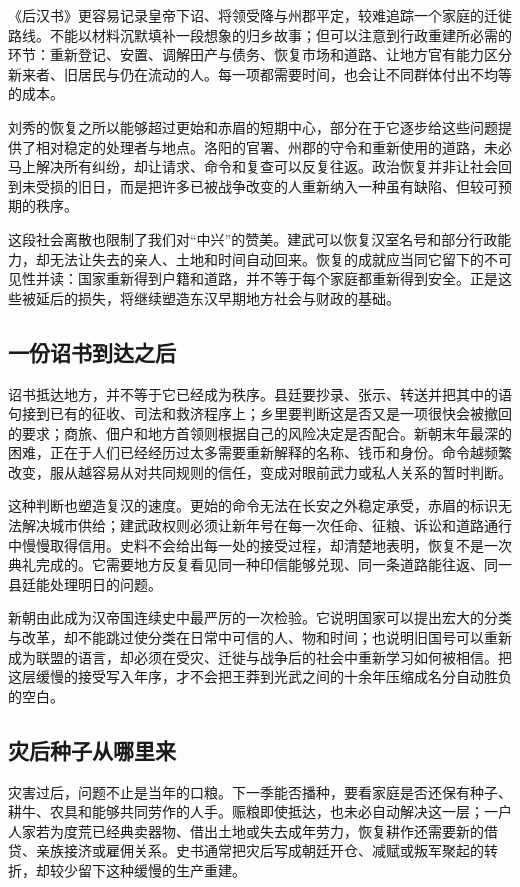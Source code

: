 《后汉书》更容易记录皇帝下诏、将领受降与州郡平定，较难追踪一个家庭的迁徙路线。不能以材料沉默填补一段想象的归乡故事；但可以注意到行政重建所必需的环节：重新登记、安置、调解田产与债务、恢复市场和道路、让地方官有能力区分新来者、旧居民与仍在流动的人。每一项都需要时间，也会让不同群体付出不均等的成本。

刘秀的恢复之所以能够超过更始和赤眉的短期中心，部分在于它逐步给这些问题提供了相对稳定的处理者与地点。洛阳的官署、州郡的守令和重新使用的道路，未必马上解决所有纠纷，却让请求、命令和复查可以反复往返。政治恢复并非让社会回到未受损的旧日，而是把许多已被战争改变的人重新纳入一种虽有缺陷、但较可预期的秩序。

这段社会离散也限制了我们对“中兴”的赞美。建武可以恢复汉室名号和部分行政能力，却无法让失去的亲人、土地和时间自动回来。恢复的成就应当同它留下的不可见性并读：国家重新得到户籍和道路，并不等于每个家庭都重新得到安全。正是这些被延后的损失，将继续塑造东汉早期地方社会与财政的基础。

\subsection{一份诏书到达之后}

诏书抵达地方，并不等于它已经成为秩序。县廷要抄录、张示、转送并把其中的语句接到已有的征收、司法和救济程序上；乡里要判断这是否又是一项很快会被撤回的要求；商旅、佃户和地方首领则根据自己的风险决定是否配合。新朝末年最深的困难，正在于人们已经经历过太多需要重新解释的名称、钱币和身份。命令越频繁改变，服从越容易从对共同规则的信任，变成对眼前武力或私人关系的暂时判断。

这种判断也塑造复汉的速度。更始的命令无法在长安之外稳定承受，赤眉的标识无法解决城市供给；建武政权则必须让新年号在每一次任命、征粮、诉讼和道路通行中慢慢取得信用。史料不会给出每一处的接受过程，却清楚地表明，恢复不是一次典礼完成的。它需要地方反复看见同一种印信能够兑现、同一条道路能往返、同一县廷能处理明日的问题。

新朝由此成为汉帝国连续史中最严厉的一次检验。它说明国家可以提出宏大的分类与改革，却不能跳过使分类在日常中可信的人、物和时间；也说明旧国号可以重新成为联盟的语言，却必须在受灾、迁徙与战争后的社会中重新学习如何被相信。把这层缓慢的接受写入年序，才不会把王莽到光武之间的十余年压缩成名分自动胜负的空白。

\subsection{灾后种子从哪里来}

灾害过后，问题不止是当年的口粮。下一季能否播种，要看家庭是否还保有种子、耕牛、农具和能够共同劳作的人手。赈粮即使抵达，也未必自动解决这一层；一户人家若为度荒已经典卖器物、借出土地或失去成年劳力，恢复耕作还需要新的借贷、亲族接济或雇佣关系。史书通常把灾后写成朝廷开仓、减赋或叛军聚起的转折，却较少留下这种缓慢的生产重建。

